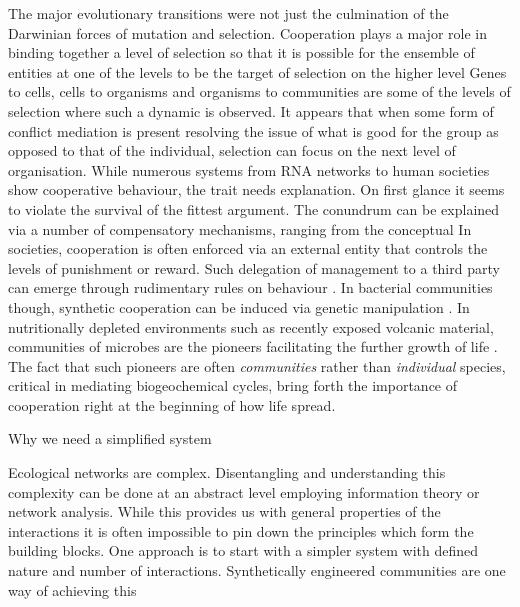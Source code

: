 The major evolutionary transitions were not just the culmination of the Darwinian forces of mutation and selection. 
Cooperation plays a major role in binding together a level of selection so that it is possible for the ensemble of entities at one of the levels to be the target of selection on the higher level %
Genes to cells, cells to organisms and organisms to communities are some of the levels of selection where such a dynamic is observed.
It appears that when some form of conflict mediation is present resolving the issue of what is good for the group as opposed to that of the individual, selection can focus on the next level of organisation.
While numerous systems from RNA networks to human societies show cooperative behaviour, the trait needs explanation.
On first glance it seems to violate the survival of the fittest argument.
The conundrum can be explained via a number of compensatory mechanisms, ranging from the conceptual %
In societies, cooperation is often enforced via an external entity that controls the levels of punishment or reward. 
Such delegation of management to a third party can emerge through rudimentary rules on behaviour \citep{sigmund:Nature:2010}.
In bacterial communities though, synthetic cooperation can be induced via genetic manipulation \citep{shou:elife:2015,campbell:elife:2015}.
In nutritionally depleted environments such as recently exposed volcanic material, communities of microbes are the pioneers facilitating the further growth of life \citep{kelly:MicEco:2014,fujimura:SciRep:2016}.
The fact that such pioneers are often \textit{communities} rather than \textit{individual} species,  critical in mediating biogeochemical cycles, bring forth the importance of cooperation right at the beginning of how life spread.

Why we need a simplified system

Ecological networks are complex.
Disentangling and understanding this complexity can be done at an abstract level employing information theory or network analysis.
While this provides us with general properties of the interactions it is often impossible to pin down the principles which form the building blocks.
One approach is to start with a simpler system with defined nature and number of interactions.
Synthetically engineered communities are one way of achieving this \citep{momeni:elife:2013}